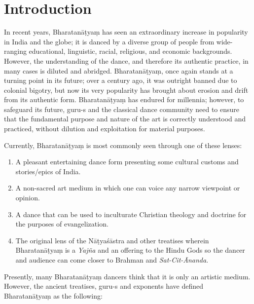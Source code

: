 \section*{Introduction}

In recent years, Bharatanāṭyaṃ has seen an extraordinary increase in popularity in India and the globe; it is danced by a diverse group of people from wide-ranging educational, linguistic, racial, religious, and economic backgrounds. However, the understanding of the dance, and therefore its authentic practice, in many cases is diluted and abridged. Bharatanāṭyaṃ, once again stands at a turning point in its future; over a century ago, it was outright banned due to colonial bigotry, but now its very popularity has brought about erosion and drift from its authentic form. Bharatanāṭyaṃ has endured for millennia; however, to safeguard its future, guru-s and the classical dance community need to ensure that the fundamental purpose and nature of the art is correctly understood and practiced, without dilution and exploitation for material purposes.

Currently, Bharatanāṭyaṃ is most commonly seen through one of these lenses:

\begin{enumerate}[{\rm 1)}]
\itemsep=0pt
\item A pleasant entertaining dance form presenting some cultural customs and stories/epics of India.

 \item A non-sacred art medium in which one can voice any narrow viewpoint or opinion.

 \item A dance that can be used to inculturate Christian theology and doctrine for the purposes of evangelization. 

 \item The original lens of the Nāṭyaśāstra and other treatises wherein Bharatanāṭyaṃ is a \textit{Yajña} and an offering to the Hindu Gods so the dancer and audience can come closer to Brahman and \textit{Sat-Cit-Ānanda}.

\end{enumerate}

Presently, many Bharatanāṭyaṃ dancers think that it is only an artistic medium. However, the ancient treatises, guru-s and exponents have defined Bharatanāṭyaṃ as the following:

